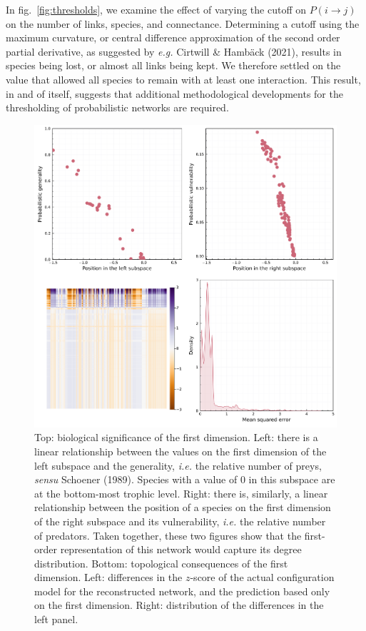 \documentclass[11pt]{article}
\makeatletter
\def\maxwidth{\ifdim\Gin@nat@width>\linewidth\linewidth
\else\Gin@nat@width\fi}
\let\Oldincludegraphics\includegraphics
\renewcommand{\includegraphics}[1]{\Oldincludegraphics[width=\maxwidth]{#1}}
\makeatother
\begin{document}
In fig.~\ref{fig:thresholds}, we examine the effect of varying the
cutoff on \(P(i \rightarrow j)\) on the number of links, species, and
connectance. Determining a cutoff using the maximum curvature, or
central difference approximation of the second order partial derivative,
as suggested by \emph{e.g.} Cirtwill \& Hambäck (2021), results in
species being lost, or almost all links being kept. We therefore settled
on the value that allowed all species to remain with at least one
interaction. This result, in and of itself, suggests that additional
methodological developments for the thresholding of probabilistic
networks are required.

\begin{figure}
\hypertarget{fig:degree}{%
\centering
\includegraphics{figures/figure-degree.png}
\caption{Top: biological significance of the first dimension. Left:
there is a linear relationship between the values on the first dimension
of the left subspace and the generality, \emph{i.e.} the relative number
of preys, \emph{sensu} Schoener (1989). Species with a value of 0 in
this subspace are at the bottom-most trophic level. Right: there is,
similarly, a linear relationship between the position of a species on
the first dimension of the right subspace and its vulnerability,
\emph{i.e.} the relative number of predators. Taken together, these two
figures show that the first-order representation of this network would
capture its degree distribution. Bottom: topological consequences of the
first dimension. Left: differences in the \(z\)-score of the actual
configuration model for the reconstructed network, and the prediction
based only on the first dimension. Right: distribution of the
differences in the left panel.}\label{fig:degree}
}

\end{figure}
\end{document}
